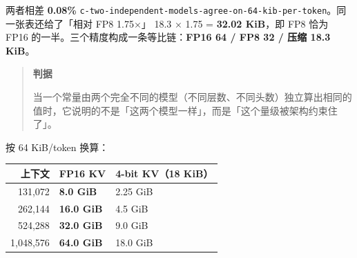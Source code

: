 两者相差 \textbf{0.08\%} {\scriptsize\texttt{c-\hspace{0pt}two-\hspace{0pt}independent-\hspace{0pt}models-\hspace{0pt}agree-\hspace{0pt}on-\hspace{0pt}64-\hspace{0pt}kib-\hspace{0pt}per-\hspace{0pt}token}}。同一张表还给了「相对 FP8 1.75×」 18.3 × 1.75 = \textbf{32.02 KiB}，即 FP8 恰为 FP16 的一半。三个精度构成一条等比链：\textbf{FP16 64 / FP8 32 / 压缩 18.3 KiB}。


\begin{quote}\small
\textbf{ 判据}

当一个常量由两个完全不同的模型（不同层数、不同头数）独立算出相同的值时，它说明的不是「这两个模型一样」，而是「这个量级被架构约束住了」。

\end{quote}

按 64 KiB/token 换算：


\begin{table}[t]
\centering
\footnotesize
\setlength{\tabcolsep}{4pt}
\label{tab:17}
\begin{tabular}{rll}
\toprule
上下文 & FP16 KV & 4-bit KV（18 KiB） \\
\midrule
131,072 & \textbf{8.0 GiB} & 2.25 GiB \\
262,144 & \textbf{16.0 GiB} & 4.5 GiB \\
524,288 & \textbf{32.0 GiB} & 9.0 GiB \\
1,048,576 & \textbf{64.0 GiB} & 18.0 GiB \\
\bottomrule
\end{tabular}
\end{table}

